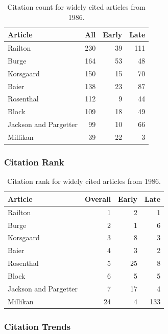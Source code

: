 \documentclass[
  10pt,
  letterpaper,
  DIV=11,
  numbers=noendperiod,
  twoside]{scrartcl}
\begin{document}
\begin{longtable}[]{@{}lrrr@{}}

\caption{\label{tbl-citation-count-1986}Citation count for widely cited
articles from 1986.}

\tabularnewline

\toprule\noalign{}
Article & All & Early & Late \\
\midrule\noalign{}
\endhead
\bottomrule\noalign{}
\endlastfoot
Railton & 230 & 39 & 111 \\
Burge & 164 & 53 & 48 \\
Korsgaard & 150 & 15 & 70 \\
Baier & 138 & 23 & 87 \\
Rosenthal & 112 & 9 & 44 \\
Block & 109 & 18 & 49 \\
Jackson and Pargetter & 99 & 10 & 66 \\
Millikan & 39 & 22 & 3 \\

\end{longtable}

\subsubsection*{Citation Rank}\label{sec-rank-1986}

\begin{longtable}[]{@{}lrrr@{}}

\caption{\label{tbl-citation-rank-1986}Citation rank for widely cited
articles from 1986.}

\tabularnewline

\toprule\noalign{}
Article & Overall & Early & Late \\
\midrule\noalign{}
\endhead
\bottomrule\noalign{}
\endlastfoot
Railton & 1 & 2 & 1 \\
Burge & 2 & 1 & 6 \\
Korsgaard & 3 & 8 & 3 \\
Baier & 4 & 3 & 2 \\
Rosenthal & 5 & 25 & 8 \\
Block & 6 & 5 & 5 \\
Jackson and Pargetter & 7 & 17 & 4 \\
Millikan & 24 & 4 & 133 \\

\end{longtable}

\subsubsection*{Citation Trends}\label{sec-trends-1986}
\end{document}
